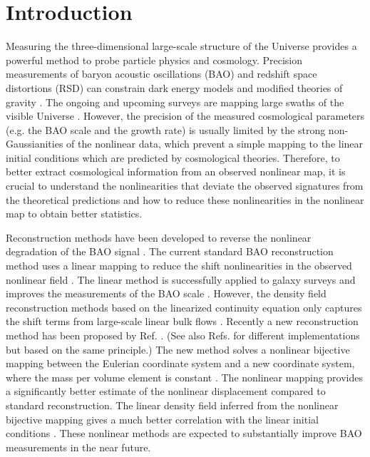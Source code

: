 \documentclass[aps,prd,twocolumn,superscriptaddress,groupedaddress,nofootinbib,amsfont]{revtex4}  %
\begin{document}
\pacs{}
\maketitle


\section{Introduction}
Measuring the three-dimensional large-scale structure of the Universe provides
a powerful method to probe particle physics and cosmology.
Precision measurements of baryon acoustic oscillations (BAO) and redshift space
distortions (RSD) can constrain dark energy models and modified theories of
gravity \cite{2016sdss,2017F,2017R,2016V,2017F2,2017G,2017S,2016S,2017Z}. 
The ongoing and upcoming surveys are mapping large swaths of the visible 
Universe \cite{2016sdss,CHIME,tianlai,DESI,pfs}.
However, the precision of the measured cosmological parameters (e.g. the BAO 
scale and the growth rate) is usually limited by the strong non-Gaussianities
of the nonlinear data, which prevent a simple mapping to the linear initial 
conditions which are predicted by cosmological theories. 
Therefore, to better extract cosmological information from an observed nonlinear
map, it is crucial to understand the nonlinearities that deviate the observed 
signatures from the theoretical predictions and how to reduce these 
nonlinearities in the nonlinear map to obtain better statistics.

Reconstruction methods have been developed to reverse the nonlinear degradation
of the BAO signal \cite{2007bao,2012TZ2,2015marcel,2017BAOP}. 
The current standard BAO reconstruction method uses a linear mapping to reduce
the shift nonlinearities in the observed nonlinear field \cite{2007bao}.
The linear method is successfully applied to galaxy surveys and improves the
measurements of the BAO scale \cite{2012nikhil,2012Anderson,2014K,2014Anderson,2014T,2015Ross,2017F,2017R}.
However, the density field reconstruction methods based on the linearized 
continuity equation only captures the shift terms from large-scale
linear bulk flows \cite{2007ESW,2009PWC,2009NWP,2012TZ,2014Tassev,2016Seo}.
Recently a new reconstruction method has been proposed by Ref. \cite{2016HMZ}. 
(See also Refs. \cite{2017Marcel,2017Shi} for different implementations but 
based on the same principle.)
The new method solves a nonlinear bijective mapping between the Eulerian 
coordinate system and a new coordinate system, where the mass per volume 
element is constant \cite{2016HMZ}. 
The nonlinear mapping provides a significantly better estimate of the nonlinear
displacement compared to standard reconstruction.
The linear density field inferred from the nonlinear bijective mapping gives a
much better correlation with the linear initial conditions \cite{2016HMZ}.
These nonlinear methods are expected to substantially improve BAO measurements 
in the near future.
\end{document}
